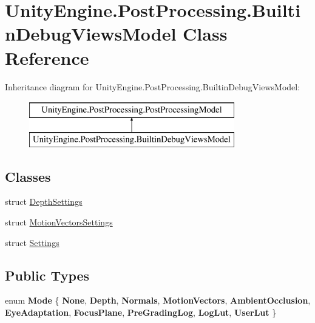 \hypertarget{class_unity_engine_1_1_post_processing_1_1_builtin_debug_views_model}{}\section{Unity\+Engine.\+Post\+Processing.\+Builtin\+Debug\+Views\+Model Class Reference}
\label{class_unity_engine_1_1_post_processing_1_1_builtin_debug_views_model}
Inheritance diagram for Unity\+Engine.\+Post\+Processing.\+Builtin\+Debug\+Views\+Model\+:\begin{figure}[H]
\begin{center}
\leavevmode
\includegraphics[height=2.000000cm]{class_unity_engine_1_1_post_processing_1_1_builtin_debug_views_model}
\end{center}
\end{figure}
\subsection*{Classes}
\begin{DoxyCompactItemize}
\item 
struct \mbox{\hyperlink{struct_unity_engine_1_1_post_processing_1_1_builtin_debug_views_model_1_1_depth_settings}{Depth\+Settings}}
\item 
struct \mbox{\hyperlink{struct_unity_engine_1_1_post_processing_1_1_builtin_debug_views_model_1_1_motion_vectors_settings}{Motion\+Vectors\+Settings}}
\item 
struct \mbox{\hyperlink{struct_unity_engine_1_1_post_processing_1_1_builtin_debug_views_model_1_1_settings}{Settings}}
\end{DoxyCompactItemize}
\subsection*{Public Types}
\begin{DoxyCompactItemize}
\item 
\mbox{\label{class_unity_engine_1_1_post_processing_1_1_builtin_debug_views_model_a55c35be6eba5f7bb9476323f3c30de36}} 
enum {\bfseries Mode} \{ \newline
{\bfseries None}, 
{\bfseries Depth}, 
{\bfseries Normals}, 
{\bfseries Motion\+Vectors}, 
\newline
{\bfseries Ambient\+Occlusion}, 
{\bfseries Eye\+Adaptation}, 
{\bfseries Focus\+Plane}, 
{\bfseries Pre\+Grading\+Log}, 
\newline
{\bfseries Log\+Lut}, 
{\bfseries User\+Lut}
 \}
\end{DoxyCompactItemize}
